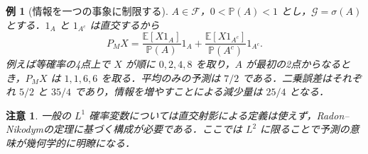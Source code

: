 \documentclass[a5paper,10pt,onecolumn]{jsarticle}
\theoremstyle{mathnotetheorem}
\newtheorem{example}[theorem]{例}
\newtheorem{remark}[theorem]{注意}
\begin{document}
\begin{example}[情報を一つの事象に制限する]
$A\in\mathcal F$，$0<\mathbb P(A)<1$ とし，$\mathcal G=\sigma(A)$ とする．$1_A$ と $1_{A^c}$ は直交するから
\[
 P_MX=\frac{\mathbb E[X1_A]}{\mathbb P(A)}1_A
 +\frac{\mathbb E[X1_{A^c}]}{\mathbb P(A^c)}1_{A^c}.
\]
例えば等確率の4点上で $X$ が順に $0,2,4,8$ を取り，$A$ が最初の2点からなるとき，$P_MX$ は $1,1,6,6$ を取る．平均のみの予測は $7/2$ である．二乗誤差はそれぞれ $5/2$ と $35/4$ であり，情報を増やすことによる減少量は $25/4$ となる．
\end{example}
\begin{remark}
一般の $L^1$ 確率変数については直交射影による定義は使えず，Radon--Nikodymの定理に基づく構成が必要である．ここでは $L^2$ に限ることで予測の意味が幾何学的に明瞭になる．
\end{remark}
\end{document}
